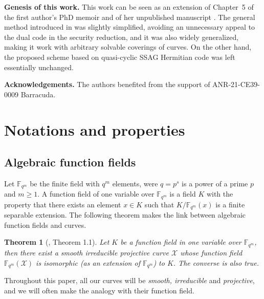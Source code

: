\documentclass[10pt]{article}
\newtheorem{thm}{Theorem}
\theoremstyle{definition}
\theoremstyle{definition}
\theoremstyle{definition}
\newcommand{\fqm}{\mathbb{F}_{q^m}}
\newcommand{\X}{\mathcal{X}}
\begin{document}
\vspace*{0.2cm}

\noindent\textbf{Genesis of this work.}
This work can be seen as an extension of Chapter~5 of the first author's PhD memoir \cite{Bar} and of her unpublished manuscript \cite{Bar2}.
The general method introduced in \cite{Bar} was slightly simplified, avoiding an unnecessary appeal to the dual code in the security reduction, and it was also widely generalized, making it work with arbitrary solvable coverings of curves.
On the other hand, the proposed scheme based on quasi-cyclic SSAG Hermitian code was left essentially unchanged.

\vspace*{0.2cm}

\noindent\textbf{Acknowledgements.}
The authors benefited from the support of ANR-21-CE39-0009 Barracuda.


\section{Notations and properties}


\subsection{Algebraic function fields}


Let $\fqm$ be the finite field with $q^m$ elements, were $q=p^s$ is a power of a prime $p$ and $m \geq 1$. A function field of one variable over $\fqm$ is a field $K$ with the property that there exists an element $x\in K$ such that $K/\fqm(x)$ is a finite separable extension. The following theorem makes the link between algebraic function fields and curves.

\begin{thm} [\cite{MOR}, Theorem 1.1]\label{lien curve-function field}
Let $K$ be a function field in one variable over $\fqm$, then there exist a smooth irreducible projective curve $\X$ whose function field $\fqm(\X)$ is isomorphic (as an extension of $\fqm$) to $K$. The converse is also true.
\end{thm}

Throughout this paper, all our curves will be \textit{smooth, irreducible} and \textit{projective}, and we will often make the analogy with their function field. 

\vspace*{0.2cm}
\end{document}
